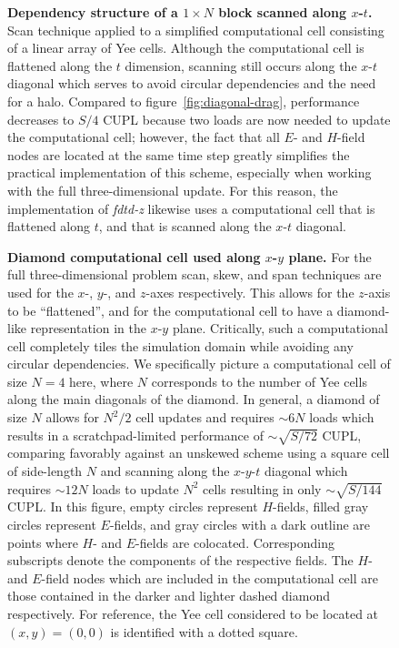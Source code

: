 \documentclass[12pt]{article}
\newcommand{\fdtdz}{\mbox{\emph{fdtd-z}}}  %
\newcommand{\myfig}[3]{
  \begin{figure}[bp]
		\begin{center}
			
      \caption{\textbf{#2}#3\label{fig:#1}}
		\end{center}
	\end{figure}
}
\begin{document}
\myfig{flat-drag}{
  Dependency structure of a $1 \times N$ block scanned along $x$-$t$.}{
  Scan technique applied to a simplified computational cell
    consisting of a linear array of Yee cells.
  Although the computational cell is flattened along the $t$ dimension,
    scanning still occurs along the $x$-$t$ diagonal
    which serves to avoid circular dependencies and the need for a halo.
  Compared to figure~\ref{fig:diagonal-drag},
    performance decreases to $S / 4$ CUPL because two loads
    are now needed to update the computational cell;
    however, the fact that all $E$- and $H$-field nodes
    are located at the same time step
    greatly simplifies the practical implementation of this scheme,
    especially when working with the full three-dimensional update.
  For this reason, the implementation of {\fdtdz} likewise
    uses a computational cell that is flattened along $t$,
    and that is scanned along the $x$-$t$ diagonal.
}

\myfig{3d-grids}{
  Diamond computational cell used along $x$-$y$ plane.}{
  For the full three-dimensional problem
    scan, skew, and span techniques are used
    for the $x$-, $y$-, and $z$-axes respectively.
  This allows for the $z$-axis to be ``flattened'',
    and for the computational cell to have a diamond-like
    representation in the $x$-$y$ plane.
  Critically, such a computational cell completely tiles
    the simulation domain while avoiding any circular dependencies.
  We specifically picture a computational cell of size $N = 4$ here,
    where $N$ corresponds to the number of Yee cells
    along the main diagonals of the diamond.
  In general, a diamond of size $N$ allows for $N^2 / 2$ cell updates
    and requires $\sim 6N$ loads
    which results in a scratchpad-limited performance
    of $\sim \sqrt{S / 72}$ CUPL,
    comparing favorably against an unskewed scheme
    using a square cell of side-length $N$
    and scanning along the $x$-$y$-$t$ diagonal
    which requires $\sim 12N$ loads to update $N^2$ cells
    resulting in only $\sim \sqrt{S / 144}$ CUPL.
  In this figure, 
	  empty circles represent $H$-fields,
    filled gray circles represent $E$-fields,
	  and gray circles with a dark outline are points
	  where $H$- and $E$-fields are colocated.
	Corresponding subscripts denote the components of the respective fields.
  The $H$- and $E$-field nodes which are included in the computational cell
    are those contained in the darker and lighter dashed diamond respectively.
  For reference, the Yee cell considered to be located at $(x, y) = (0, 0)$
    is identified with a dotted square.
}
\end{document}
